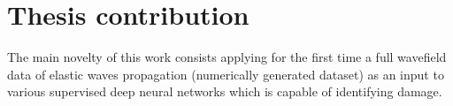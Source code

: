 \section{Thesis contribution}
\label{sec15}
The main novelty of this work consists applying for the first time a full wavefield data of elastic waves propagation (numerically generated dataset) as an input to various supervised deep neural networks which is capable of identifying damage.